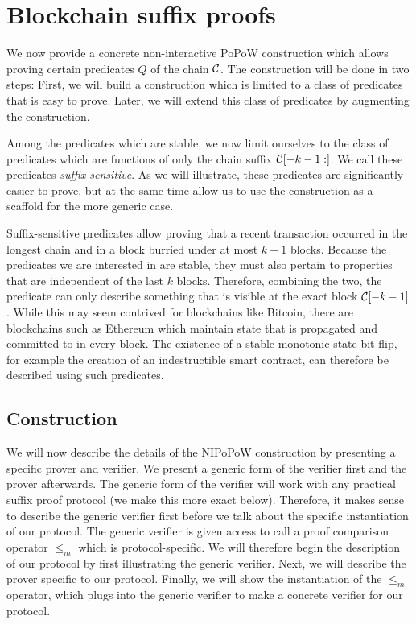 \section{Blockchain suffix proofs}

We now provide a concrete non-interactive PoPoW construction which allows
proving certain predicates $Q$ of the chain $\mathcal{C}$. The construction will
be done in two steps: First, we will build a construction which is limited to
a class of predicates that is easy to prove. Later, we will extend this class
of predicates by augmenting the construction.

Among the predicates which are stable, we now limit ourselves to the class of
predicates which are functions of only the chain suffix $\mathcal{C}[-k - 1:]$. We
call these predicates \textit{suffix sensitive}. As we will illustrate, these
predicates are significantly easier to prove, but at the same time allow us to
use the construction as a scaffold for the more generic case.

Suffix-sensitive predicates allow proving that a recent transaction occurred in
the longest chain and in a block burried under at most $k + 1$ blocks. Because
the predicates we are interested in are stable, they must also pertain to
properties that are independent of the last $k$ blocks. Therefore, combining the
two, the predicate can only describe something that is visible at the exact
block $\mathcal{C}[-k-1]$. While this may seem contrived for blockchains like
Bitcoin, there are blockchains such as Ethereum which maintain state that is
propagated and committed to in every block. The existence of a stable monotonic
state bit flip, for example the creation of an indestructible smart contract,
can therefore be described using such predicates.

\subsection{Construction}

We will now describe the details of the NIPoPoW construction by presenting a
specific prover and verifier. We present a generic form of the verifier first
and the prover afterwards. The generic form of the verifier will work with any
practical suffix proof protocol (we make this more exact below). Therefore, it
makes sense to describe the generic verifier first before we talk about the
specific instantiation of our protocol. The generic verifier is given access to
call a proof comparison operator $\leq_m$ which is protocol-specific. We will
therefore begin the description of our protocol by first illustrating the
generic verifier. Next, we will describe the prover specific to our protocol.
Finally, we will show the instantiation of the $\leq_m$ operator, which plugs
into the generic verifier to make a concrete verifier for our protocol.

